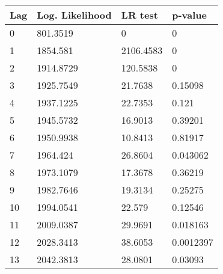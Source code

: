 \begin{tabular}{llll}
Lag & Log. Likelihood & LR test & p-value \\ 
\hline 
0 & 801.3519 & 0 & 0 \\ 
1 & 1854.581 & 2106.4583 & 0 \\ 
2 & 1914.8729 & 120.5838 & 0 \\ 
3 & 1925.7549 & 21.7638 & 0.15098 \\ 
4 & 1937.1225 & 22.7353 & 0.121 \\ 
5 & 1945.5732 & 16.9013 & 0.39201 \\ 
6 & 1950.9938 & 10.8413 & 0.81917 \\ 
7 & 1964.424 & 26.8604 & 0.043062 \\ 
8 & 1973.1079 & 17.3678 & 0.36219 \\ 
9 & 1982.7646 & 19.3134 & 0.25275 \\ 
10 & 1994.0541 & 22.579 & 0.12546 \\ 
11 & 2009.0387 & 29.9691 & 0.018163 \\ 
12 & 2028.3413 & 38.6053 & 0.0012397 \\ 
13 & 2042.3813 & 28.0801 & 0.03093 \\ 
\hline 
\end{tabular}